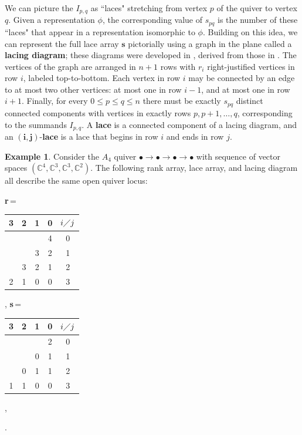 \documentclass[reqno]{amsart}
\newcommand{\C}{\mathbb{C}}
\numberwithin{equation}{section}
\theoremstyle{definition}
\newtheorem{example}[theorem]{Example}
\theoremstyle{remark}
\begin{document}
We can picture the $I_{p,q}$ as ``laces" stretching from vertex $p$ of the quiver to vertex $q$. Given a representation $\phi$, the corresponding value of $s_{pq}$ is the number of these ``laces" that appear in a representation isomorphic to $\phi$. Building on this idea, we can represent the full lace array $\mathbf{s}$ pictorially using a graph in the plane called a \textbf{lacing diagram}; these diagrams were developed in \cite{kms06}, derived from those in \cite{AD85}.
The vertices of the graph are arranged in $n+1$ rows with $r_i$ right-justified vertices in row $i$, labeled top-to-bottom. Each vertex in row $i$ may be connected by an edge to at most two other vertices: at most one in row $i-1$, and at most one in row $i+1$. Finally, for every $0 \leq p\leq q\leq n$ there must be exactly $s_{pq}$ distinct connected components with vertices in exactly rows $p,p+1,\dots,q$, corresponding to the summands $I_{p,q}$. A \textbf{lace} is a connected component of a lacing diagram, and an $\mathbf{(i,j)}$-\textbf{lace} is a lace that begins in row $i$ and ends in row $j$.
\begin{example}\label{ex:lace}
Consider the $A_4$ quiver $\bullet \to \bullet \to \bullet \to \bullet$ with sequence of vector spaces $(\C^4, \C^3, \C^3, \C^2)$. The following rank array, lace array, and lacing diagram all describe the same open quiver locus:
\begin{center}
\textbf{r}\,=
\begin{tabular}{c c c c|c}
  3 & 2 & 1 & 0 & $i \diagup j$\\\hline
    &   &   & 4 & 0\\
    &   & 3 & 2 & 1\\
    & 3 & 2 & 1 & 2\\
  2 & 1 & 0 & 0 & 3
\end{tabular}, \hspace{1cm}
\textbf{s}\,=
\begin{tabular}{c c c c|c}
  3 & 2 & 1 & 0 & $i \diagup j$\\\hline
    &   &   & 2 & 0\\
    &   & 0 & 1 & 1\\
    & 0 & 1 & 1 & 2\\
  1 & 1 & 0 & 0 & 3
\end{tabular}, \hspace{1cm}
.
\end{center}
\end{example}
\end{document}
